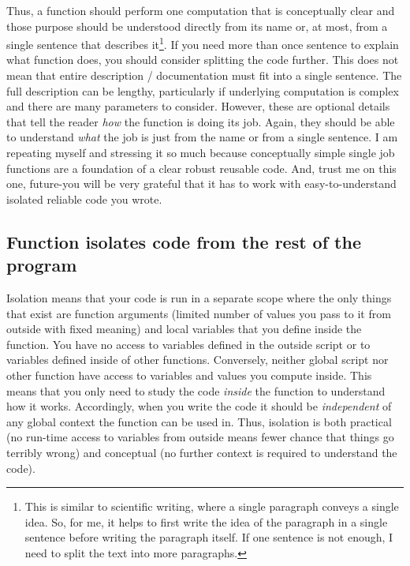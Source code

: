 \documentclass[
]{book}
\begin{document}
Thus, a function should perform one computation that is conceptually clear and those purpose should be understood directly from its name or, at most, from a single sentence that describes it\footnote{This is similar to scientific writing, where a single paragraph conveys a single idea. So, for me, it helps to first write the idea of the paragraph in a single sentence before writing the paragraph itself. If one sentence is not enough, I need to split the text into more paragraphs.}. If you need more than once sentence to explain what function does, you should consider splitting the code further. This does not mean that entire description / documentation must fit into a single sentence. The full description can be lengthy, particularly if underlying computation is complex and there are many parameters to consider. However, these are optional details that tell the reader \emph{how} the function is doing its job. Again, they should be able to understand \emph{what} the job is just from the name or from a single sentence. I am repeating myself and stressing it so much because conceptually simple single job functions are a foundation of a clear robust reusable code. And, trust me on this one, future-you will be very grateful that it has to work with easy-to-understand isolated reliable code you wrote.

\hypertarget{function-isolates-code-from-the-rest-of-the-program}{%
\subsection*{Function isolates code from the rest of the program}\label{function-isolates-code-from-the-rest-of-the-program}}

Isolation means that your code is run in a separate scope where the only things that exist are function arguments (limited number of values you pass to it from outside with fixed meaning) and local variables that you define inside the function. You have no access to variables defined in the outside script or to variables defined inside of other functions. Conversely, neither global script nor other function have access to variables and values you compute inside. This means that you only need to study the code \emph{inside} the function to understand how it works. Accordingly, when you write the code it should be \emph{independent} of any global context the function can be used in. Thus, isolation is both practical (no run-time access to variables from outside means fewer chance that things go terribly wrong) and conceptual (no further context is required to understand the code).
\end{document}
